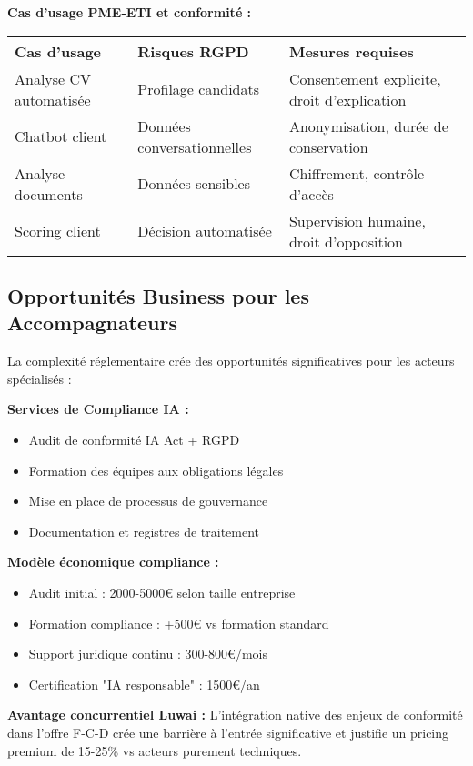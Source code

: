 \textbf{Cas d'usage PME-ETI et conformité :}
\begin{longtable}{@{}p{4cm}p{5cm}p{5cm}@{}}
\toprule
\textbf{Cas d'usage} & \textbf{Risques RGPD} & \textbf{Mesures requises} \\
\midrule
Analyse CV automatisée & Profilage candidats & Consentement explicite, droit d'explication \\
Chatbot client & Données conversationnelles & Anonymisation, durée de conservation \\
Analyse documents & Données sensibles & Chiffrement, contrôle d'accès \\
Scoring client & Décision automatisée & Supervision humaine, droit d'opposition \\
\bottomrule
\end{longtable}

\subsection{Opportunités Business pour les Accompagnateurs}

La complexité réglementaire crée des opportunités significatives pour les acteurs spécialisés :

\textbf{Services de Compliance IA :}
\begin{itemize}
    \item Audit de conformité IA Act + RGPD
    \item Formation des équipes aux obligations légales
    \item Mise en place de processus de gouvernance
    \item Documentation et registres de traitement
\end{itemize}

\textbf{Modèle économique compliance :}
\begin{itemize}
    \item Audit initial : 2000-5000€ selon taille entreprise
    \item Formation compliance : +500€ vs formation standard
    \item Support juridique continu : 300-800€/mois
    \item Certification "IA responsable" : 1500€/an
\end{itemize}

\textbf{Avantage concurrentiel Luwai :}
L'intégration native des enjeux de conformité dans l'offre F-C-D crée une barrière à l'entrée significative et justifie un pricing premium de 15-25\% vs acteurs purement techniques.
